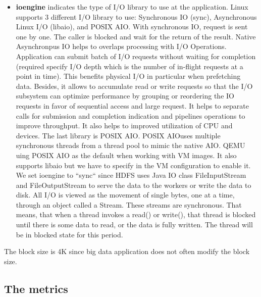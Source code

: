\documentclass{acmsig}
\begin{document}
\begin{itemize}
  \item \textbf{ioengine} indicates the type of I/O library to use at the application. Linux supports 3 different I/O library to use: Synchronous IO (sync), Asynchronous Linux I/O (libaio), and POSIX AIO. With synchronous IO, request is sent one by one. The caller is blocked and wait for the return of the result. Native Asynchronpus IO helps to overlaps processing with I/O Operations. Application can submit batch of I/O requests without waiting for completion (required specify I/O depth which is the number of in-flight requests at a point in time). This benefits physical I/O in particular when prefetching data. Besides, it allows to accumulate read or write requests so that the I/O subsystem can optimize performance by grouping or reordering the IO requests in favor of sequential access and large request. It helps to separate calls for submission and completion indication and pipelines operations to improve throughput. It also helps to improved utilization of CPU and devices. The last library is POSIX AIO. POSIX AIOuses multiple synchronous threads from a thread pool to mimic the native AIO. QEMU uing POSIX AIO as the default when working with VM images. It also supports libaio but we have to specify in the VM configuration to enable it. We set ioengine to ``sync`` since HDFS uses Java IO class FileInputStream and FileOutputStream to serve the data to the workers or write the data to disk. All I/O is viewed as the movement of single bytes, one at a time, through an object called a Stream. These streams are synchronous. That means, that when a thread invokes a read() or write(), that thread is blocked until there is some data to read, or the data is fully written. The thread will be in blocked state for this period.
\end{itemize}

The block size is 4K since big data application does not often modify the block size.

\subsection{The metrics}
\end{document}
